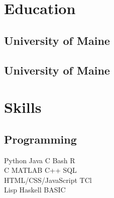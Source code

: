 \documentclass[letterpaper]{resume_AMcEnaney} %
\begin{document}
\begin{minipage}[t]{0.33\textwidth} %


\section{Education} 

    \subsection{University of Maine}

    \sectionspace

    \subsection{University of Maine}


    \sectionspace %


\section{Skills}

    \subsection{Programming}

        \textbullet{} Python \textbullet{} Java \textbullet{} C \textbullet{} Bash \textbullet{} R \\
        \textbullet{} C \textbullet{} MATLAB \textbullet{} C++ \textbullet{} SQL \\ 
        \textbullet{} HTML/CSS/JavaScript \textbullet{} TCl \\
        \textbullet{} Lisp \textbullet{} Haskell \textbullet{} BASIC
        

\end{minipage}
\end{document}
